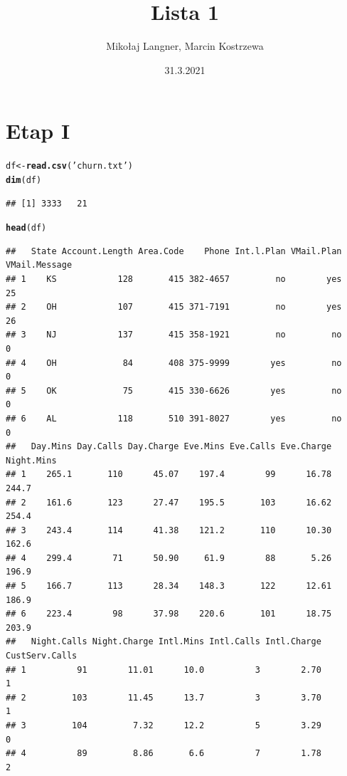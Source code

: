 \documentclass{article}\usepackage[]{graphicx}\usepackage[]{color}
\title{Lista 1}
\author{Mikołaj Langner, Marcin Kostrzewa}
\date{31.3.2021}
\makeatletter
\newcommand{\hlstr}[1]{\textcolor[rgb]{0.192,0.494,0.8}{#1}}%
\newcommand{\hlstd}[1]{\textcolor[rgb]{0.345,0.345,0.345}{#1}}%
\newcommand{\hlkwb}[1]{\textcolor[rgb]{0.69,0.353,0.396}{#1}}%
\newcommand{\hlkwd}[1]{\textcolor[rgb]{0.737,0.353,0.396}{\textbf{#1}}}%
\newenvironment{kframe}{%
 \def\at@end@of@kframe{}%
 \ifinner\ifhmode%
  \def\at@end@of@kframe{\end{minipage}}%
  \begin{minipage}{\columnwidth}%
 \fi\fi%
 \def\FrameCommand##1{\hskip\@totalleftmargin \hskip-\fboxsep
 \colorbox{shadecolor}{##1}\hskip-\fboxsep
     \hskip-\linewidth \hskip-\@totalleftmargin \hskip\columnwidth}%
 \MakeFramed {\advance\hsize-\width
   \@totalleftmargin\z@ \linewidth\hsize
   \@setminipage}}%
 {\par\unskip\endMakeFramed%
 \at@end@of@kframe}
\newenvironment{knitrout}{}{} %
\makeatother
\begin{document}
\maketitle

\section{Etap I}

\begin{knitrout}
\color{fgcolor}\begin{kframe}
\begin{alltt}
\hlstd{df} \hlkwb{<-} \hlkwd{read.csv}\hlstd{(}\hlstr{'churn.txt'}\hlstd{)}
\hlkwd{dim}\hlstd{(df)}
\end{alltt}
\begin{verbatim}
## [1] 3333   21
\end{verbatim}
\begin{alltt}
\hlkwd{head}\hlstd{(df)}
\end{alltt}
\begin{verbatim}
##   State Account.Length Area.Code    Phone Int.l.Plan VMail.Plan VMail.Message
## 1    KS            128       415 382-4657         no        yes            25
## 2    OH            107       415 371-7191         no        yes            26
## 3    NJ            137       415 358-1921         no         no             0
## 4    OH             84       408 375-9999        yes         no             0
## 5    OK             75       415 330-6626        yes         no             0
## 6    AL            118       510 391-8027        yes         no             0
##   Day.Mins Day.Calls Day.Charge Eve.Mins Eve.Calls Eve.Charge Night.Mins
## 1    265.1       110      45.07    197.4        99      16.78      244.7
## 2    161.6       123      27.47    195.5       103      16.62      254.4
## 3    243.4       114      41.38    121.2       110      10.30      162.6
## 4    299.4        71      50.90     61.9        88       5.26      196.9
## 5    166.7       113      28.34    148.3       122      12.61      186.9
## 6    223.4        98      37.98    220.6       101      18.75      203.9
##   Night.Calls Night.Charge Intl.Mins Intl.Calls Intl.Charge CustServ.Calls
## 1          91        11.01      10.0          3        2.70              1
## 2         103        11.45      13.7          3        3.70              1
## 3         104         7.32      12.2          5        3.29              0
## 4          89         8.86       6.6          7        1.78              2

\end{verbatim}
\end{kframe}
\end{knitrout}
\end{document}

